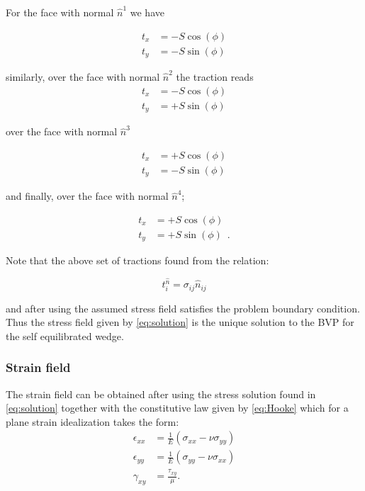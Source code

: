 For the face with normal $\hat{n}^1$ we have

\begin{align*}
t_{x} &= -S\cos(\phi)\\
t_{y} &= -S\sin(\phi)
\end{align*}

similarly, over the face with normal $\hat{n}^2$ the traction reads
\begin{align*}
t_{x} &= -S\cos(\phi)\\
t_{y} &= +S\sin(\phi)
\end{align*}

over the face with normal $\hat{n}^3$

\begin{align*}
t_{x} &= +S\cos(\phi)\\
t_{y} &= -S\sin(\phi)
\end{align*}

and finally, over the face with normal $\hat{n}^4$;

\begin{align*}
t_{x} &= +S\cos(\phi)\\
t_{y} &= +S\sin(\phi) \enspace .
\end{align*}

Note that the above set of tractions found from the relation:

\[t_i^{\hat n} = \sigma_{ij} \hat n_{ij}\]

and after using the assumed stress field satisfies the problem boundary condition. Thus the stress field given by \cref{eq:solution} is the unique solution to the BVP for the self equilibrated wedge.

\subsubsection*{Strain field}
The strain field can be obtained after using the stress solution found in \cref{eq:solution} together with the constitutive law given by \cref{eq:Hooke} which for a plane strain idealization takes the form:
\begin{equation}
\begin{aligned}
\epsilon_{xx}& = \frac{1}{E}(\sigma_{xx} - \nu \sigma_{yy}) \\
\epsilon_{yy}& = \frac{1}{E}(\sigma_{yy} - \nu \sigma_{xx}) \\
\gamma_{xy}& = \frac{\tau _{xy}}{\mu}.
\end{aligned}
\label{eq:cons model}
\end{equation}

